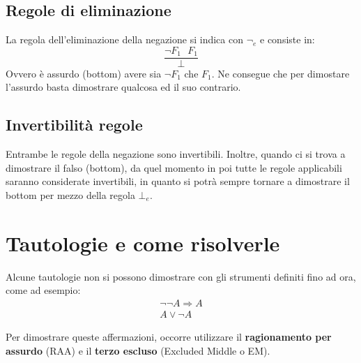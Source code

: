 \documentclass[12pt]{article}
\begin{document}
\subsection{Regole di eliminazione}
\label{ssec:neg_elim}
La regola dell'eliminazione della negazione si indica con $\neg_e$ e consiste in:
\begin{equation}
    \dfrac{\neg F_1 \text{ } F_1}{\bot} \label{rule:neg_elim}
\end{equation}
Ovvero è assurdo (bottom) avere sia $\neg F_1$ che $F_1$. Ne consegue che per dimostare l'assurdo basta dimostrare qualcosa ed il suo contrario.

\subsection{Invertibilità regole}
\label{ssec:neg_invert_rules}
Entrambe le regole della negazione sono invertibili. Inoltre, quando ci si trova a dimostrare il falso (bottom), da quel momento in poi tutte le regole applicabili saranno considerate invertibili, in quanto si potrà sempre tornare a dimostrare il bottom per mezzo della regola $\bot_e$.

\section{Tautologie e come risolverle}
\label{sec:tautologies}
Alcune tautologie non si possono dimostrare con gli strumenti definiti fino ad ora, come ad esempio:
\begin{gather*}
    \neg \neg A \Rightarrow A \\
    A \vee \neg A
\end{gather*}

Per dimostrare queste affermazioni, occorre utilizzare il \textbf{ragionamento per assurdo} (RAA) e il \textbf{terzo escluso} (Excluded Middle o EM).
\end{document}
